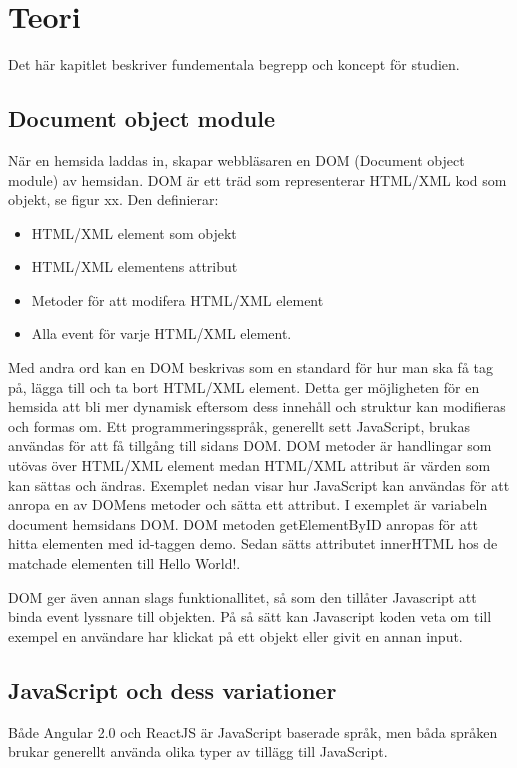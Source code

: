 \section{Teori}
\label{sec:axel-theory}
Det här kapitlet beskriver fundementala begrepp och koncept för studien.

\subsection{Document object module}
När en hemsida laddas in, skapar webbläsaren en DOM (Document object module) av hemsidan. DOM är ett träd som representerar HTML/XML kod som objekt, se figur xx. Den definierar:

\begin{itemize}
\item HTML/XML element som objekt
\item HTML/XML elementens attribut
\item Metoder för att modifera HTML/XML element
\item Alla event för varje HTML/XML element.
\end{itemize} 

Med andra ord kan en DOM beskrivas som en standard för hur man ska få tag på, lägga till och ta bort HTML/XML element. Detta ger möjligheten för en hemsida att bli mer dynamisk eftersom dess innehåll och struktur kan modifieras och formas om. Ett programmeringsspråk, generellt sett JavaScript, brukas användas för att få tillgång till sidans DOM. DOM metoder är handlingar som utövas över HTML/XML element medan HTML/XML attribut är värden som kan sättas och ändras. Exemplet nedan visar hur JavaScript kan användas för att anropa en av DOMens metoder och sätta ett attribut. I exemplet är variabeln document hemsidans DOM. DOM metoden getElementByID anropas för att hitta elementen med id-taggen demo. Sedan sätts attributet innerHTML hos de matchade elementen till Hello World!. 

DOM ger även annan slags funktionallitet, så som den tillåter Javascript att binda event lyssnare till objekten. På så sätt kan Javascript koden veta om till exempel en användare har klickat på ett objekt eller givit en annan input.


\subsection{JavaScript och dess variationer}
Både Angular 2.0 och ReactJS är JavaScript baserade språk, men båda språken brukar generellt använda olika typer av tillägg till JavaScript.

